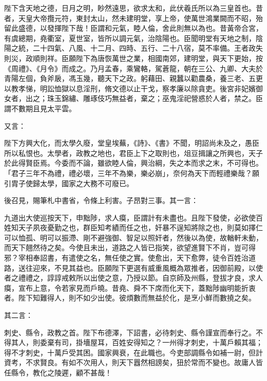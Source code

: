 \begin{pinyinscope}
 陛下含天地之德，日月之明，眇然遠思，欲求太和，此伏羲氏所以為三皇首也。昔者，天皇大帝攬元符，東封太山，然未建明堂，享上帝，使萬世鴻業闕而不昭，殆留此盛德，以發揮陛下哉！臣謂和元氣，睦人倫，舍此則無以為也。昔黃帝合宮，有虞總期，堯衢室，夏世室，皆所以調元氣，治陰陽也。臣聞明堂有天地之制，陰陽之統，二十四氣、八風、十二月、四時、五行、二十八宿，莫不率備。王者政失則災，政順則祥。臣願陛下為唐恢萬世之業，相國南郊，建明堂，與天下更始，按《周禮》、《月令》而成之。乃月孟春，乘鸞輅，駕蒼龍，朝在三公、九卿、大夫於青陽左個，負斧扆，馮玉幾，聽天下之政。躬藉田、親蠶以勸農桑，養三老、五更以教孝悌，明訟恤獄以息淫刑，脩文德以止干戈，察孝廉以除貪吏。後宮非妃嬪御女者，出之；珠玉錦繡、雕琢伎巧無益者，棄之；巫鬼淫祀營惑於人者，禁之。臣謂不數期且見太平雲。



 又言：



 陛下方興大化，而太學久廢，堂皇埃蕪，《詩》、《書》不聞，明詔尚未及之，愚臣所以私恨也。太學者，政教之地也，君臣上下之取則也，俎豆揖讓之所興也，天子於此得賢臣焉。今委而不論，雖欲睦人倫，興治綱，失之本而求之末，不可得也。「君子三年不為禮，禮必壞，三年不為樂，樂必崩」，奈何為天下而輕禮樂哉？願引胄子使歸太學，國家之大務不可廢已。



 後召見，賜筆札中書省，令條上利害。子昂對三事。其一言：



 九道出大使巡按天下，申黜陟，求人瘼，臣謂計有未盡也。且陛下發使，必欲使百姓知天子夙夜憂勤之也，群臣知考績而任之也，奸暴不逞知將除之也，則莫如擇仁可以恤孤、明可以振滯、剛不避強御、智足以照奸者，然後以為使，故輶軒未動，而天下翹然待之矣。今使且未出，道路之人皆已指笑，欲望進賢下不肖，豈可得邪？宰相奉詔書，有遣使之名，無任使之實。使愈出，天下愈弊，徒令百姓治道路，送往迎來，不見其益也。臣願陛下更選有威重風概為眾推者，因御前殿，以使者之禮禮之，諄諄戒敕所以出使之意，乃授以節。自京師及州縣，登拔才良，求人瘼，宣布上意，令若家見而戶曉。昔堯、舜不下席而化天下，蓋黜陟幽明能折衷者。陛下知難得人，則不如少出使。彼煩數而無益於化，是烹小鮮而數撓之矣。



 其二言：



 刺史、縣令，政教之首。陛下布德澤，下詔書，必待刺史、縣令謹宣而奉行之。不得其人，則委棄有司，掛墻屋耳，百姓安得知之？一州得才刺史，十萬戶賴其福；得不才刺史，十萬戶受其困。國家興衰，在此職也。今吏部調縣令如補一尉，但計資考，不求賢良。有如不次用人，則天下囂然相謗矣，狃於常而不變也。故庸人皆任縣令，教化之陵遲，顧不甚哉！




\end{pinyinscope}

